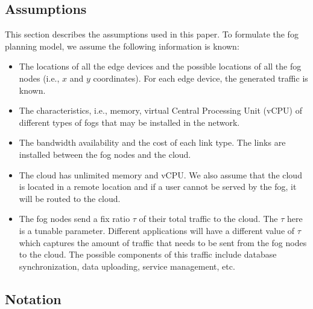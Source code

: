 \documentclass[10pt,journal,compsoc]{IEEEtran}
\begin{document}
\subsection{Assumptions}\label{assumption}
This section describes the assumptions used in this paper. To formulate the fog planning model, we assume the following information is known:  
\begin{itemize}
\item The locations of all the edge devices and the possible locations of all the fog nodes (i.e., $x$ and $y$ coordinates). For each edge device, the generated traffic is known.
\item The characteristics, i.e., memory, virtual Central Processing Unit (vCPU) of different types of fogs that may be installed in the network.
\item The bandwidth availability and the cost of each link type. The links are installed between the fog nodes and the cloud.
\item The cloud has unlimited memory and vCPU. We also assume that the cloud is located in a remote location and if a user cannot be served by the fog, it will be routed to the cloud.
\item The fog nodes send a fix ratio $\tau$ of their total traffic to the cloud. The $\tau$ here is a tunable parameter. Different applications will have a different value of $\tau$ which captures the amount of traffic that needs to be sent from the fog nodes to the cloud. The possible components of this traffic include database synchronization, data uploading, service management, etc.
\end{itemize}






\subsection{Notation}
\end{document}
